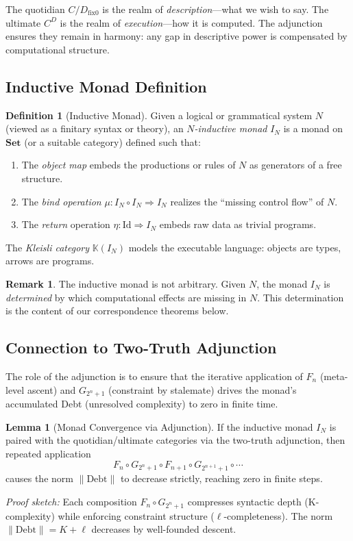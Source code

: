 \documentclass[a4paper,11pt]{article}
\theoremstyle{definition}
\newtheorem{definition}{Definition}[section]
\newtheorem{lemma}{Lemma}[section]
\newtheorem{remark}{Remark}[section]
\begin{document}
The quotidian $C/D_{\mathrm{fix}0}$ is the realm of \emph{description}—what we wish to say. The ultimate $C^D$ is the realm of \emph{execution}—how it is computed. The adjunction ensures they remain in harmony: any gap in descriptive power is compensated by computational structure.

\subsection{Inductive Monad Definition}

\begin{definition}[Inductive Monad]
Given a logical or grammatical system $N$ (viewed as a finitary syntax or theory), an \emph{$N$-inductive monad} $I_N$ is a monad on $\mathbf{Set}$ (or a suitable category) defined such that:

\begin{enumerate}
  \item The \emph{object map} embeds the productions or rules of $N$ as generators of a free structure.
  \item The \emph{bind operation} $\mu : I_N \circ I_N \Rightarrow I_N$ realizes the ``missing control flow'' of $N$.
  \item The \emph{return} operation $\eta : \text{Id} \Rightarrow I_N$ embeds raw data as trivial programs.
\end{enumerate}

The \emph{Kleisli category} $\mathbb{K}(I_N)$ models the executable language: objects are types, arrows are programs.
\end{definition}

\begin{remark}
The inductive monad is not arbitrary. Given $N$, the monad $I_N$ is \emph{determined} by which computational effects are missing in $N$. This determination is the content of our correspondence theorems below.
\end{remark}

\subsection{Connection to Two-Truth Adjunction}

The role of the adjunction is to ensure that the iterative application of $F_n$ (meta-level ascent) and $G_{2^n+1}$ (constraint by stalemate) drives the monad's accumulated Debt (unresolved complexity) to zero in finite time.

\begin{lemma}[Monad Convergence via Adjunction]
If the inductive monad $I_N$ is paired with the quotidian/ultimate categories via the two-truth adjunction, then repeated application
\[
  F_n \circ G_{2^n+1} \circ F_{n+1} \circ G_{2^{n+1}+1} \circ \cdots
\]
causes the norm $\|\text{Debt}\|$ to decrease strictly, reaching zero in finite steps.

\emph{Proof sketch:} Each composition $F_n \circ G_{2^n+1}$ compresses syntactic depth (K-complexity) while enforcing constraint structure (\(\ell\)-completeness). The norm $\|\text{Debt}\| = K + \ell$ decreases by well-founded descent.
\end{lemma}
\end{document}
